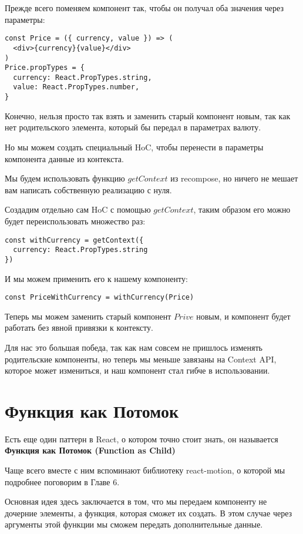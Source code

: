 Прежде всего поменяем компонент так, чтобы он получал оба значения через параметры:

\begin{lstlisting}
const Price = ({ currency, value }) => (
  <div>{currency}{value}</div>
)
Price.propTypes = {
  currency: React.PropTypes.string,
  value: React.PropTypes.number,
}
\end{lstlisting}

Конечно, нельзя просто так взять и заменить старый компонент новым, так как нет родительского элемента, который бы передал в параметрах валюту.

Но мы можем создать специальный HoC, чтобы перенести в параметры компонента данные из контекста.

Мы будем использовать функцию $getContext$ из recompose, но ничего не мешает вам написать собственную реализацию с нуля.

Создадим отдельно сам HoC с помощью $getContext$, таким образом его можно будет переиспользовать множество раз: 

\begin{lstlisting}
const withCurrency = getContext({
  currency: React.PropTypes.string
})
\end{lstlisting}

И мы можем применить его к нашему компоненту:

\begin{lstlisting}
const PriceWithCurrency = withCurrency(Price)
\end{lstlisting}

Теперь мы можем заменить старый компонент $Prive$ новым, и компонент будет работать без явной привязки к контексту.

Для нас это большая победа, так как нам совсем не пришлось изменять родительские компоненты, но теперь мы меньше завязаны на Context API, которое может измениться, и наш компонент стал гибче в использовании.


\section{Функция как Потомок}

Есть еще один паттерн в React, о котором точно стоит знать, он называется \textbf{Функция как Потомок (Function as Child)}

Чаще всего вместе с ним вспоминают библиотеку react-motion, о которой мы подробнее поговорим в Главе 6.

Основная идея здесь заключается в том, что мы передаем компоненту не дочерние элементы, а функция, которая сможет их создать. В этом случае через аргументы этой функции мы сможем передать дополнительные данные.


